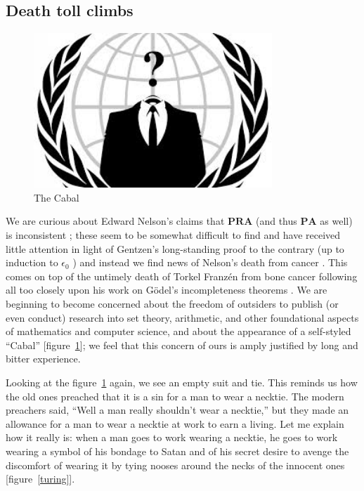 \documentclass[letterpaper]{article}
\begin{document}
\subsection{Death toll climbs}
\begin{figure}
	\centering
	\includegraphics[width=0.8\textwidth]{mmm.jpg}
	\caption{The Cabal}
	\label{figcabal}
\end{figure}
We are curious about Edward Nelson's claims that $\mathbf{PRA}$ (and thus $\mathbf{PA}$ as well) is inconsistent \cite{nelson2015inc}; these seem to be somewhat difficult to find and have received little attention in light of Gentzen's long-standing proof to the contrary (up to induction to $\epsilon_0$ \cite{gentzen1936,takeuti2013proof}) and instead we find news of Nelson's death from cancer \cite{kelly2014ed}.  This comes on top of the untimely death of Torkel Franz{\'e}n from bone cancer following all too closely upon his work on G{\"o}del's incompleteness theorems \cite{franzen2003,franzen2005}.  We are beginning to become concerned about the freedom of outsiders to publish (or even conduct) research into set theory, arithmetic, and other foundational aspects of mathematics and computer science, and about the appearance of a self-styled ``Cabal'' \cite{wiki2016cabal,neeman2016} [figure~\ref{figcabal}];  we feel that this concern of ours is amply justified by long and bitter experience.

Looking at the figure~\ref{figcabal} again, we see an empty suit and tie.  This reminds us how the old ones preached that it is a sin for a man to wear a necktie.  The modern preachers said, ``Well a man really shouldn't wear a necktie,'' but they made an allowance for a man to wear a necktie at work to earn a living.  Let me explain how it really is:  when a man goes to work wearing a necktie, he goes to work wearing a symbol of his bondage to Satan and of his secret desire to avenge the discomfort of wearing it by tying nooses around the necks of the innocent ones [figure~\ref{turing}].
\end{document}
